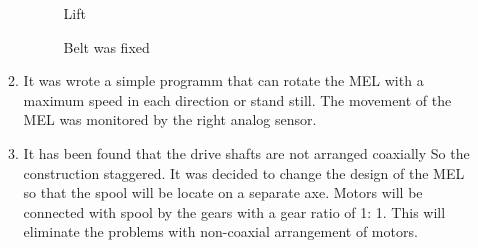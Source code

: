\begin{enumerate}
\begin{enumerate}
\begin{figure}[H]
\begin{minipage}[h]{0.27\linewidth}
      	\end{minipage}
      	\hfill
      	\begin{minipage}[h]{0.27\linewidth}
      	\end{minipage}
      	\vfill
      	\begin{minipage}[h]{0.4\linewidth}
      		\caption{Lift}
      	\end{minipage}
      	\hfill
      	\begin{minipage}[h]{0.58\linewidth}
      		\caption{Belt was fixed}
      	\end{minipage}
      \end{figure}
      
      \item	It was wrote a simple programm that can rotate the MEL with a maximum speed in each direction or stand still. The movement of the MEL was monitored by the right analog sensor.
      
      \item	It has been found that the drive shafts are not arranged coaxially So the construction staggered. It was decided to change the design of the MEL so that the spool will be locate on a separate axe. Motors will be connected with spool by the gears with a gear ratio of 1: 1. This will eliminate the problems with non-coaxial arrangement of motors.
      

\end{enumerate}
\end{enumerate}
